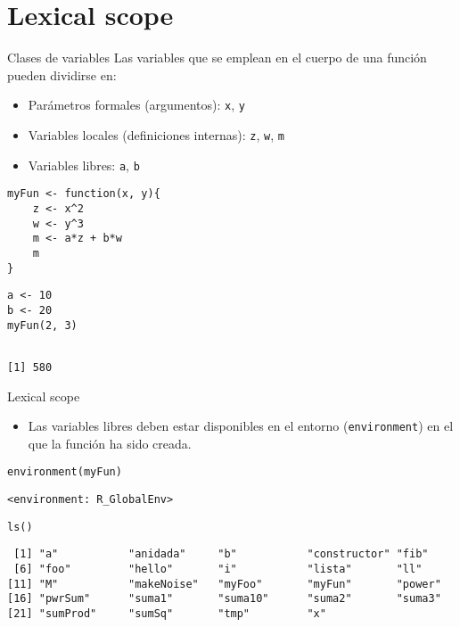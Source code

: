 \documentclass[xcolor={usenames,svgnames,dvipsnames}]{beamer}
\begin{document}
\section{Lexical scope}
\label{sec:orgb2e409a}

\begin{frame}[label={sec:orga32f7a1},fragile]{Clases de variables}
 Las variables que se emplean en el cuerpo de una función pueden
dividirse en:
\begin{itemize}
\item Parámetros formales (argumentos): \texttt{x}, \texttt{y}
\item Variables locales (definiciones internas): \texttt{z}, \texttt{w}, \texttt{m}
\item Variables libres: \texttt{a}, \texttt{b}
\end{itemize}
\lstset{language=r,label= ,caption= ,captionpos=b,numbers=none}
\begin{lstlisting}
myFun <- function(x, y){
    z <- x^2
    w <- y^3
    m <- a*z + b*w
    m
}
\end{lstlisting}

\lstset{language=r,label= ,caption= ,captionpos=b,numbers=none}
\begin{lstlisting}
a <- 10
b <- 20
myFun(2, 3)
\end{lstlisting}

\begin{verbatim}

[1] 580
\end{verbatim}
\end{frame}

\begin{frame}[label={sec:org1728385},fragile]{Lexical scope}
 \begin{itemize}
\item Las variables libres deben estar disponibles en el entorno
(\texttt{environment}) en el que la función ha sido creada.
\end{itemize}
\lstset{language=r,label= ,caption= ,captionpos=b,numbers=none}
\begin{lstlisting}
environment(myFun) 
\end{lstlisting}

\begin{verbatim}
<environment: R_GlobalEnv>
\end{verbatim}


\lstset{language=r,label= ,caption= ,captionpos=b,numbers=none}
\begin{lstlisting}
ls()
\end{lstlisting}

\begin{verbatim}
 [1] "a"           "anidada"     "b"           "constructor" "fib"        
 [6] "foo"         "hello"       "i"           "lista"       "ll"         
[11] "M"           "makeNoise"   "myFoo"       "myFun"       "power"      
[16] "pwrSum"      "suma1"       "suma10"      "suma2"       "suma3"      
[21] "sumProd"     "sumSq"       "tmp"         "x"
\end{verbatim}
\end{frame}
\end{document}
